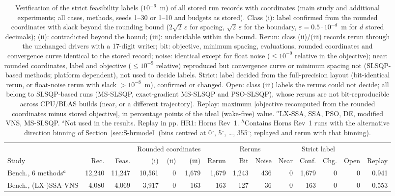 \begin{table}[!htbp]
\centering
\caption{Verification of the strict feasibility labels ($10^{-6}$~m) of all stored run records with coordinates
(main study and additional experiments; all cases, methods, seeds 1--30 or 1--10 and budgets as stored).
Class (i): label confirmed from the rounded coordinates with slack beyond the rounding bound
($2\sqrt2\,\varepsilon$ for spacing, $\sqrt2\,\varepsilon$ for the boundary, $\varepsilon=0.5\cdot10^{-d}$~m for $d$
stored decimals); (ii): contradicted beyond the bound; (iii): undecidable within the bound. Rerun: class (ii)/(iii)
records rerun through the unchanged drivers with a 17-digit writer; bit: objective, minimum spacing, evaluations,
rounded coordinates and convergence curve identical to the stored record; noise: identical except for float noise
($\le10^{-9}$ relative in the objective); near: rounded coordinates, label and objective ($\le10^{-9}$ relative)
reproduced but convergence curve or minimum spacing not (SLSQP-based methods; platform dependent), not used to
decide labels. Strict: label decided from the full-precision layout (bit-identical
rerun, or float-noise rerun with slack $>10^{-8}$~m), confirmed or changed. Open: class (iii) labels the reruns could not
decide; all belong to SLSQP-based runs (MS-SLSQP, exact-gradient MS-SLSQP and PSO-SLSQP), whose reruns are not
bit-reproducible across CPU/BLAS builds (near, or a different trajectory). Replay: maximum $|$objective recomputed from
the rounded coordinates minus stored objective$|$, in percentage points of the ideal (wake-free) value.
$^a$LX-SSA, SSA, PSO, DE, modified VNS, MS-SLSQP. $^s$Not used in the results.
Replay in pp. HR1: Horns Rev~1. $^h$Contains Horns Rev~1 runs with the alternative direction binning of Section~\ref{sec:S-hrmodel} (bins centred at 0$^\circ$, 5$^\circ$, \ldots, 355$^\circ$; replayed and rerun with that binning).}
\label{tab:S-r3-precision}
\scriptsize\setlength{\tabcolsep}{1.5pt}
\begin{tabular}{lrrrrrrrrrrrrr}
\toprule
& & & \multicolumn{3}{c}{Rounded coordinates} & \multicolumn{4}{c}{Reruns} & \multicolumn{2}{c}{Strict label} & & \\
\cmidrule(lr){4-6}\cmidrule(lr){7-10}\cmidrule(lr){11-12}
Study & Rec. & Feas. & (i) & (ii) & (iii) & Rerun & Bit & Noise & Near & Conf. & Chg. & Open & Replay \\
\midrule
Bench., 6 methods$^a$ & 12,240 & 11,247 & 10,561 & 0 & 1,679 & 1,679 & 1,243 & 436 & 0 & 1,679 & 0 & 0 & 0.941 \\
Bench., (LX-)SSA-VNS & 4,080 & 4,069 & 3,917 & 0 & 163 & 163 & 127 & 36 & 0 & 163 & 0 & 0 & 0.553 \\

\end{tabular}
\end{table}
